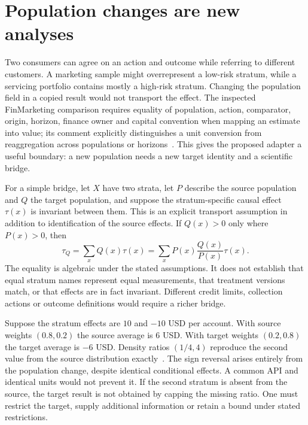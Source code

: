 \section{Population changes are new analyses}

Two consumers can agree on an action and outcome while referring to different
customers. A marketing sample might overrepresent a low-risk stratum, while a
servicing portfolio contains mostly a high-risk stratum. Changing the
population field in a copied result would not transport the effect. The
inspected FinMarketing comparison requires equality of population, action,
comparator, origin, horizon, finance owner and capital convention when mapping
an estimate into value; its comment explicitly distinguishes a unit conversion
from reaggregation across populations or horizons~\citep{exec13_i3_inspection}.
This gives the proposed adapter a useful boundary: a new population needs
a new target identity and a scientific bridge.

For a simple bridge, let $X$ have two strata, let $P$ describe the source
population and $Q$ the target population, and suppose the stratum-specific
causal effect $\tau(x)$ is invariant between them. This is an explicit
transport assumption in addition to identification of the source effects.
If $Q(x)>0$ only where $P(x)>0$, then
\begin{equation}
 \tau_Q=\sum_xQ(x)\tau(x)
       =\sum_xP(x)\frac{Q(x)}{P(x)}\tau(x).
 \label{exec13:i3-transport}
\end{equation}
The equality is algebraic under the stated assumptions. It does not establish
that equal stratum names represent equal measurements, that treatment versions
match, or that effects are in fact invariant. Different credit limits,
collection actions or outcome definitions would require a richer bridge.

Suppose the stratum effects are $10$ and $-10$ USD per account. With source
weights $(0.8,0.2)$ the source average is $6$ USD. With target weights
$(0.2,0.8)$ the target average is $-6$ USD. Density ratios $(1/4,4)$
reproduce the second value from the source distribution exactly~\citep{exec13_i3_composition}. The sign reversal arises entirely from the
population change, despite identical conditional effects. A common API and
identical units would not prevent it. If the second stratum is absent from
the source, the target result is not obtained by capping the missing ratio.
One must restrict the target, supply additional information or retain a bound
under stated restrictions.

